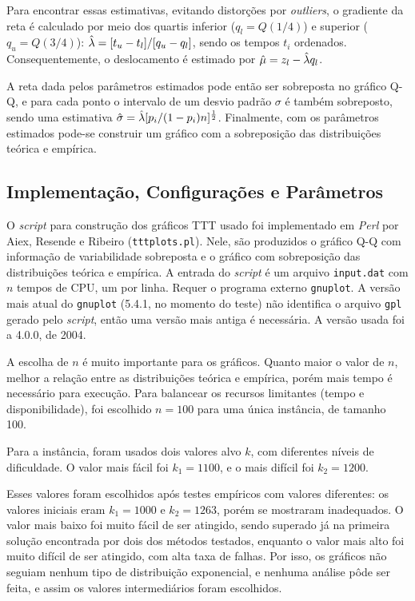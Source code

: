 \documentclass{MO824}
\begin{document}
    Para encontrar essas estimativas, evitando distorções por \textit{outliers}, o gradiente da reta é calculado por meio dos quartis inferior ($q_l=Q(1/4)$) e superior ($q_u=Q(3/4)$): $\Hat{\lambda} = [t_u-t_l]/[q_u-q_l]$, sendo os tempos $t_i$ ordenados. Consequentemente, o deslocamento é estimado por $\Hat{\mu}=z_l-\Hat{\lambda}q_l$. 
    
    A reta dada pelos parâmetros estimados pode então ser sobreposta no gráfico Q-Q, e para cada ponto o intervalo de um desvio padrão $\sigma$ é também sobreposto, sendo uma estimativa $\Hat{\sigma}=\Hat{\lambda}[p_i/(1-p_i)n]^\frac{1}{2}$. Finalmente, com os parâmetros estimados pode-se construir um gráfico com a sobreposição das distribuições teórica e empírica.

\subsection{Implementação, Configurações e Parâmetros}
    O \textit{script} para construção dos gráficos TTT usado foi implementado em \textit{Perl} por Aiex, Resende e Ribeiro \cite{ttt} (\texttt{tttplots.pl}). Nele, são produzidos o gráfico Q-Q com informação de variabilidade sobreposta e o gráfico com sobreposição das distribuições teórica e empírica. A entrada do \textit{script} é um arquivo \texttt{input.dat} com $n$ tempos de CPU, um por linha. Requer o programa externo \texttt{gnuplot}. A versão mais atual do \texttt{gnuplot} (5.4.1, no momento do teste) não identifica o arquivo \texttt{gpl} gerado pelo \textit{script}, então uma versão mais antiga é necessária. A versão usada foi a 4.0.0, de 2004.
    
    A escolha de $n$ é muito importante para os gráficos. Quanto maior o valor de $n$, melhor a relação entre as distribuições teórica e empírica, porém mais tempo é necessário para execução. Para balancear os recursos limitantes (tempo e disponibilidade), foi escolhido $n=100$ para uma única instância, de tamanho 100.
    
    Para a instância, foram usados dois valores alvo $k$, com diferentes níveis de dificuldade. O valor mais fácil foi $k_1=1100$, e o mais difícil foi $k_2=1200$. 
    
    Esses valores foram escolhidos após testes empíricos com valores diferentes: os valores iniciais eram $k_1=1000$ e $k_2=1263$, porém se mostraram inadequados. O valor mais baixo foi muito fácil de ser atingido, sendo superado já na primeira solução encontrada por dois dos métodos testados, enquanto o valor mais alto foi muito difícil de ser atingido, com alta taxa de falhas. Por isso, os gráficos não seguiam nenhum tipo de distribuição exponencial, e nenhuma análise pôde ser feita, e assim os valores intermediários foram escolhidos.
    
\end{document}
